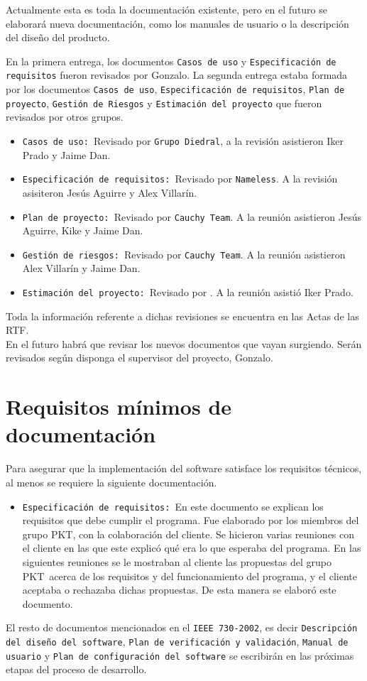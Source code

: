 \documentclass[spanish,a4paper,11pt, twoside]{report}	%
\newcommand*{\PKT}{\hbox{P}\kern-2.5pt\lower3.5pt\hbox{\small{K}}\kern-2.8pt\hbox{T}\kern-2pt}	%
\begin{document}
		Actualmente esta es toda la documentación existente, pero en el futuro se elaborará nueva documentación, 
		como los manuales de usuario o la descripción del diseño del producto.

			En la primera entrega, los documentos \texttt{Casos de uso} y \texttt{Especificación de requisitos} fueron revisados por Gonzalo. 
		La segunda entrega estaba formada por los documentos \texttt{Casos de uso}, \texttt{Especificación de requisitos}, \texttt{Plan de proyecto}, 
		\texttt{Gestión de Riesgos} y \texttt{Estimación del proyecto} que fueron revisados por otros grupos.
		 \begin{itemize}
		   \item \texttt{Casos de uso: }Revisado por \texttt{Grupo Diedral}, a la revisión asistieron Iker Prado y Jaime Dan.
		   \item \texttt{Especificación de requisitos: }Revisado por \texttt{Nameless}. A la revisión asisiteron Jesús Aguirre y Alex Villarín.
		   \item \texttt{Plan de proyecto: }Revisado por \texttt{Cauchy Team}. A la reunión asistieron Jesús Aguirre, Kike y Jaime Dan.
		   \item \texttt{Gestión de riesgos: }Revisado por \texttt{Cauchy Team}. A la reunión asistieron Alex Villarín y Jaime Dan.
		   \item \texttt{Estimación del proyecto: }Revisado por \texttt{}. A la reunión asistió Iker Prado.%
		 \end{itemize}
		 Toda la información referente a dichas revisiones se encuentra en las Actas de las RTF.\\
		 En el futuro habrá que revisar los nuevos documentos que vayan surgiendo. Serán revisados según disponga el supervisor del proyecto, Gonzalo.
		 
	\section{Requisitos mínimos de documentación}
		Para asegurar que la implementación del software satisface los requisitos técnicos, al menos se requiere la siguiente documentación.
		\begin{itemize}
		  \item \texttt{Especificación de requisitos: }En este documento se explican los requisitos que debe cumplir el programa. 
		  			Fue elaborado por los miembros del grupo \PKT , con la colaboración del cliente. Se hicieron varias reuniones con el cliente 
		  			en las que este explicó qué era lo que esperaba del programa. En las siguientes reuniones se le mostraban al cliente las propuestas del 
		  			grupo \PKT\ acerca de los requisitos y del funcionamiento del programa, y el cliente aceptaba o rechazaba dichas propuestas. 
		  			De esta manera se elaboró este documento.
		\end{itemize}
		El resto de documentos mencionados en el \texttt{IEEE 730-2002}, es decir \texttt{Descripción del diseño del software}, \texttt{Plan de verificación y validación}, 
		\texttt{Manual de usuario} y  \texttt{Plan de configuración del software} se escribirán en las próximas etapas del proceso de desarrollo. 
\end{document}
